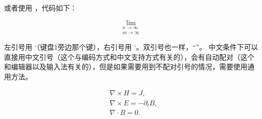 

或者使用 ，代码如下：

%
%
%
%
\begin{example}
\[ \lim_{\substack{n\to\infty\\ m\to\infty}} \]
\end{example}
 



左引号用 `（键盘1旁边那个键），右引号用 `。双引号也一样，``''。
中文条件下可以直接用中文引号（这个与编码方式和中文支持方式有关的），会有自动配对（这个和编辑器以及输入法有关的），但是如果需要用到不配对引号的情况，需要使用通用方法。




\begin{example}
\begin{align}
& \nabla \times H = J,\\
& \nabla \times E = - \partial _t B,\\
& \nabla \cdot B = 0.
\end{align}
\end{example}

